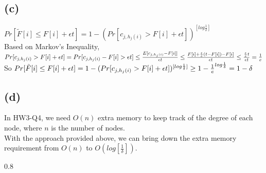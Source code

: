\documentclass{article}
\newenvironment{myenv}[1]
  {\begin{spacing}{#1}}
  {\end{spacing}}
\begin{document}
\subsection{(c)}
$Pr[\tilde F[i]\le F[i]+\epsilon t] = 1-(Pr[c_{j,h_j(i)} > F[i] + \epsilon t])^{[log\frac{1}{\delta}]}$ \\
Based on Markov's Inequality, \\ $Pr[c_{j,h_j(i)} > F[i] + \epsilon t]  =  \\
Pr[c_{j,h_j(i)} - F[i] > \epsilon t]  \le \\
 \frac{E[c_{j,h_j(i)} - F[i]]}{\epsilon t} \le \\
  \frac{F[i]+\frac{\epsilon}{e}(t-F[i]) - F[i]}{\epsilon t} \le   \frac{\frac{\epsilon}{e}t}{\epsilon t} = \frac{1}{e}$
So $Pr[\tilde F[i]\le F[i]+\epsilon t] =  \\
1-(Pr[c_{j,h_j(i)} > F[i] + \epsilon t])^{[log\frac{1}{\delta}]} \ge
1 - \frac{1}{e}^{log\frac{1}{\delta}} = 1 - \delta$ \\

\subsection{(d)}
In HW3-Q4, we need $O(n)$ extra memory to keep track of the degree of each node, where $n$ is the number of nodes.\\
With the approach provided above, we can bring down the extra memory requirement from $O(n)$ to $O(log[\frac{1}{\delta}])$.

\begin{myenv}{0.8}
\begin{verbatim}
\end{verbatim}
\end{myenv}
\end{document}
